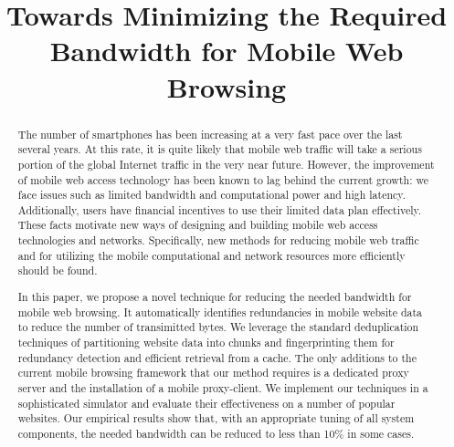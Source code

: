\documentclass[10pt, conference, compsocconf]{IEEEtran}
\begin{document}
%
\title{Towards Minimizing the Required Bandwidth for Mobile Web Browsing}


\author{
}

\maketitle

\begin{abstract}
The number of smartphones has been increasing at a very fast pace over the last several 
years. At this rate, it is quite likely that mobile web traffic will take a serious portion of the global Internet traffic in the very near future. However, the improvement of mobile web access technology has been known to lag behind the current growth: we face issues such as limited bandwidth and computational power and high latency. Additionally, users have financial incentives to use their limited data plan effectively.
These facts motivate new ways of designing and building mobile web access technologies and networks. Specifically, new methods for reducing mobile web traffic and for utilizing the mobile computational and network resources more efficiently should be found.

In this paper, we propose a novel technique for reducing the needed bandwidth for mobile web browsing. It automatically identifies redundancies in mobile website data to reduce the number of transimitted bytes. We leverage the standard deduplication techniques of partitioning website data into chunks and fingerprinting them
for redundancy detection and efficient retrieval from a cache. The only additions to the current mobile browsing framework that our method requires is a dedicated proxy server and the installation of a mobile proxy-client. We implement our techniques in a sophisticated 
simulator and evaluate their effectiveness on a number of popular websites. Our empirical results 
show that, with an appropriate tuning of all system components, the needed bandwidth can be reduced 
to less than 10\% in some cases.

\end{abstract}
\end{document}
